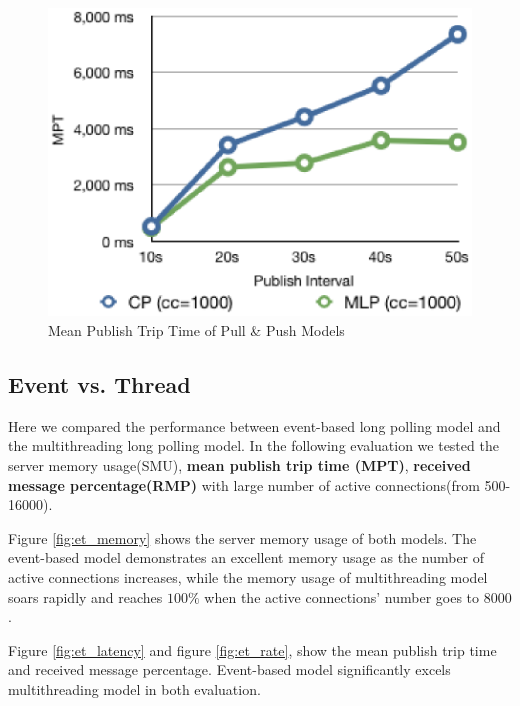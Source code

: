 \begin{figure}[htb!]
\centering%
    \includegraphics[scale=0.60]{figures/latency.eps}
    \caption{Mean Publish Trip Time of Pull \& Push Models}
    \label{fig:traffic_latency}
\end{figure}

\subsection{Event vs. Thread\\}

Here we compared the performance between event-based long polling model
and the multithreading long polling model. In the following evaluation
we tested the {server memory usage(SMU)}, {\bf mean publish trip time
(MPT)}, {\bf received message percentage(RMP)} with large number of
active connections(from 500-16000).

Figure \ref{fig:et_memory} shows the server memory usage of both models.
The event-based model demonstrates an excellent memory usage as the
number of active connections increases, while the memory usage of 
multithreading model soars rapidly and reaches $100\%$ when the active
connections' number goes to $8000$.

Figure \ref{fig:et_latency} and figure \ref{fig:et_rate}, show the mean
publish trip time and received message percentage. Event-based model 
significantly excels multithreading model in both evaluation.

